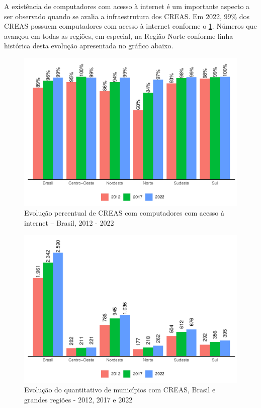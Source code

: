 \documentclass[
  brazilian]{report}
\begin{document}
A existência de computadores com acesso à internet é um importante
aspecto a ser observado quando se avalia a infraestrutura dos CREAS. Em
2022, 99\% dos CREAS possuem computadores com acesso à internet conforme
o \cref{fig:CREAS-internet-percentual}. Números que avançou em todas as
regiões, em especial, na Região Norte conforme linha histórica desta
evolução apresentada no gráfico abaixo.

\begin{figure}
\includegraphics{Censo-SUAS-2022_files/figure-latex/CREAS-internet-percentual-1} \caption[Evolução percentual de CREAS com computadores com acesso à internet – Brasil, 2012 - 2022]{Evolução percentual de CREAS com computadores com acesso à internet – Brasil, 2012 - 2022}\label{fig:CREAS-internet-percentual}
\end{figure}

\begin{figure}
\includegraphics{Censo-SUAS-2022_files/figure-latex/CREAS-quantidade-municipios-1} \caption[Evolução do quantitativo de municípios com CREAS, Brasil e grandes regiões - 2012, 2017 e 2022]{Evolução do quantitativo de municípios com CREAS, Brasil e grandes regiões - 2012, 2017 e 2022}\label{fig:CREAS-quantidade-municipios}
\end{figure}
\end{document}

